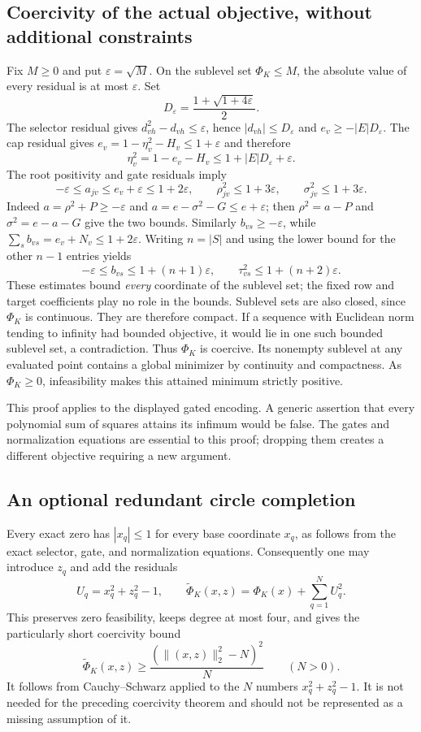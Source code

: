 \subsection{Coercivity of the actual objective, without additional constraints}
\label{sec:budget-coercivity}
Fix $M\ge0$ and put $\varepsilon=\sqrt M$. On the sublevel set
$\Phi_K\le M$, the absolute value of every residual is at most
$\varepsilon$. Set
\[
 D_\varepsilon=\frac{1+\sqrt{1+4\varepsilon}}2.
\]
The selector residual gives $d_{vh}^2-d_{vh}\le\varepsilon$, hence
$|d_{vh}|\le D_\varepsilon$ and $e_v\ge-|E|D_\varepsilon$.
The cap residual gives
$e_v=1-\eta_v^2-H_v\le1+\varepsilon$ and therefore
\[
 \eta_v^2=1-e_v-H_v\le1+|E|D_\varepsilon+\varepsilon.
\]
The root positivity and gate residuals imply
\[
 -\varepsilon\le a_{jv}\le e_v+\varepsilon\le1+2\varepsilon,
 \qquad
 \rho_{jv}^2\le1+3\varepsilon,
 \qquad
 \sigma_{jv}^2\le1+3\varepsilon.
\]
Indeed $a=\rho^2+P\ge-\varepsilon$ and
$a=e-\sigma^2-G\le e+\varepsilon$; then
$\rho^2=a-P$ and $\sigma^2=e-a-G$ give the two bounds.
Similarly $b_{vs}\ge-\varepsilon$, while
$\sum_sb_{vs}=e_v+N_v\le1+2\varepsilon$. Writing $n=|S|$ and using the
lower bound for the other $n-1$ entries yields
\[
 -\varepsilon\le b_{vs}\le1+(n+1)\varepsilon,
 \qquad
 \tau_{vs}^2\le1+(n+2)\varepsilon.
\]
These estimates bound \emph{every} coordinate of the sublevel set; the
fixed row and target coefficients play no role in the bounds. Sublevel sets
are also closed, since $\Phi_K$ is continuous. They are therefore compact.
If a sequence with Euclidean norm tending to infinity had bounded objective,
it would lie in one such bounded sublevel set, a contradiction. Thus
$\Phi_K$ is coercive. Its nonempty sublevel at any evaluated point contains
a global minimizer by continuity and compactness. As $\Phi_K\ge0$,
infeasibility makes this attained minimum strictly positive.

This proof applies to the displayed gated encoding. A generic assertion
that every polynomial sum of squares attains its infimum would be false.
The gates and normalization equations are essential to this proof; dropping
them creates a different objective requiring a new argument.

\subsection{An optional redundant circle completion}
Every exact zero has $|x_q|\le1$ for every base coordinate $x_q$, as follows
from the exact selector, gate, and normalization equations. Consequently
one may introduce $z_q$ and add the residuals
\[
 U_q=x_q^2+z_q^2-1,\qquad
 \widetilde\Phi_K(x,z)=\Phi_K(x)+\sum_{q=1}^NU_q^2.
\]
This preserves zero feasibility, keeps degree at most four, and gives the
particularly short coercivity bound
\[
 \widetilde\Phi_K(x,z)
 \ge\frac{(\|(x,z)\|_2^2-N)^2}{N}\qquad(N>0).
\]
It follows from Cauchy--Schwarz applied to the $N$ numbers
$x_q^2+z_q^2-1$. It is not needed for the preceding coercivity theorem and
should not be represented as a missing assumption of it.

